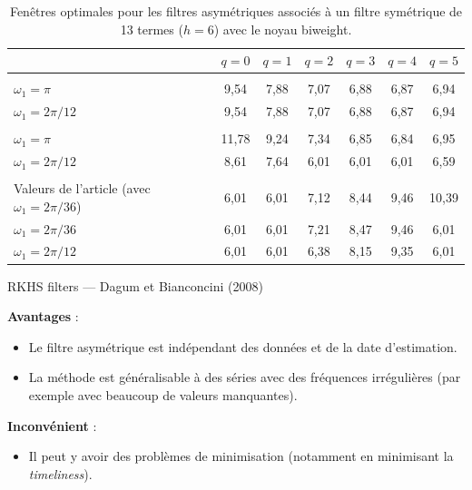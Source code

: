\documentclass[
  12pt,
  a4paper,french]{article}
\providecommand{\tightlist}{%
  \setlength{\itemsep}{0pt}\setlength{\parskip}{0pt}}
\newcommand\1{\mathds{1}}
\begin{document}
\begin{table}[!h]

\caption{\label{tab:optimalbwrkhs}Fenêtres optimales pour les filtres asymétriques associés à un filtre symétrique de 13 termes ($h=6$) avec le noyau biweight.}
\centering
\begin{tabular}[t]{lcccccc}
\toprule
  & $q=0$ & $q=1$ & $q=2$ & $q=3$ & $q=4$ & $q=5$\\
\midrule
\addlinespace[0.3em]
\multicolumn{7}{l}{\textbf{$b_{q,\Gamma}$}}\\
\hspace{1em}$\omega_1 = \pi$ & 9,54 & 7,88 & 7,07 & 6,88 & 6,87 & 6,94\\
\hspace{1em}$\omega_1 = 2\pi/12$ & 9,54 & 7,88 & 7,07 & 6,88 & 6,87 & 6,94\\
\addlinespace[0.3em]
\multicolumn{7}{l}{\textbf{$b_{q,G}$}}\\
\hspace{1em}$\omega_1 = \pi$ & 11,78 & 9,24 & 7,34 & 6,85 & 6,84 & 6,95\\
\hspace{1em}$\omega_1 = 2\pi/12$ & 8,61 & 7,64 & 6,01 & 6,01 & 6,01 & 6,59\\
\addlinespace[0.3em]
\multicolumn{7}{l}{\textbf{$b_{q,\varphi}$}}\\
\hspace{1em}Valeurs de l'article (avec $\omega_1 = 2\pi/36$) & 6,01 & 6,01 & 7,12 & 8,44 & 9,46 & 10,39\\
\hspace{1em}$\omega_1 = 2\pi/36$ & 6,01 & 6,01 & 7,21 & 8,47 & 9,46 & 6,01\\
\hspace{1em}$\omega_1 = 2\pi/12$ & 6,01 & 6,01 & 6,38 & 8,15 & 9,35 & 6,01\\
\bottomrule
\end{tabular}
\end{table}

\begin{summary_box}{RKHS filters --- Dagum et Bianconcini (2008)}

\textbf{Avantages} :

\begin{itemize}
\item
  Le filtre asymétrique est indépendant des données et de la date d'estimation.
\item
  La méthode est généralisable à des séries avec des fréquences irrégulières (par exemple avec beaucoup de valeurs manquantes).
\end{itemize}

\textbf{Inconvénient} :

\begin{itemize}
\tightlist
\item
  Il peut y avoir des problèmes de minimisation (notamment en minimisant la \emph{timeliness}).
\end{itemize}

\end{summary_box}
\end{document}
